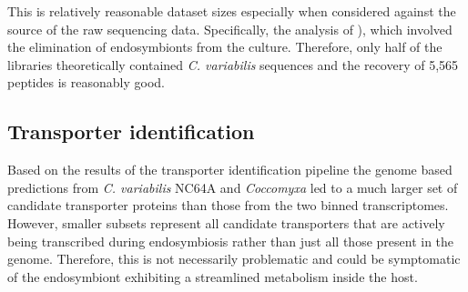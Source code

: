 This is relatively reasonable dataset sizes especially
when considered against the source of the raw sequencing data.
Specifically, the analysis of \citep{Kodama2014}), which
involved the elimination of endosymbionts from the culture.
Therefore, only half of the libraries theoretically contained
\textit{C. variabilis} sequences and the recovery of 5,565 peptides
is reasonably good.


\subsection{Transporter identification}
\begin{table}
    \centering

    \caption[Summary of predicted transporters across algal sequences]{Summary
        of the sizes of the complete transporter complements identified in the 
        various algal sequence sets. The two genome based predicted proteomes
        generated much larger predicted sets of proteins (\textit{C. variabilis} NC64A
    and \textit{C. subellipsoidea} C-169).}
\end{table}

Based on the results of the transporter identification pipeline the 
genome based predictions from \textit{C. variabilis} NC64A and \textit{Coccomyxa}
led to a much larger set of candidate
transporter proteins than those from the two binned transcriptomes.
However, smaller subsets represent all 
candidate transporters
that are actively being transcribed during endosymbiosis rather than just
all those present in the genome. Therefore, this is not necessarily problematic
and could be symptomatic of the endosymbiont exhibiting a streamlined
metabolism inside the host.


